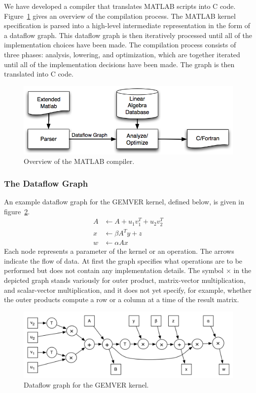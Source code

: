 \documentclass[11pt]{article}
\begin{document}
We have developed a compiler that translates MATLAB scripts into C code.    Figure~\ref{fig:compiler} gives an overview of the compilation process. The MATLAB kernel specification is parsed into a high-level intermediate representation in the form of a dataflow graph.  This dataflow graph is then iteratively processed until all of the implementation choices have been made.  The compilation process consists of three phases: analysis, lowering, and optimization, which are together iterated until all of the implementation decisions have been made.  The graph is then translated into C code.

\begin{figure}[htbp]
\centering
\includegraphics[width=.7\textwidth]{figures/compile.png}

\caption{Overview of the MATLAB compiler.}
\label{fig:compiler}
\end{figure}

\subsubsection{The Dataflow Graph}

An example dataflow graph for the GEMVER kernel, defined below, is given in figure~\ref{fig:gemver-dataflow}.
\begin{align*}
  A &\gets A + u_1 v_1^T + u_2 v_2^T \\[-0.5ex]
  x &\gets \beta A^T y + z \\[-0.5ex]
  w &\gets \alpha A x
\end{align*}
Each node represents a parameter of the kernel or an operation.  The arrows indicate the flow of data. At first the graph specifies what operations are to be performed but does not contain any implementation details. The symbol $\times$ in the depicted graph stands variously for outer product, matrix-vector multiplication, and scalar-vector multiplication, and it does not yet specify, for example, whether the outer products compute a row or a column at a time of the result matrix.

\begin{figure}[htbp]
\centering
\includegraphics[width=.7\textwidth]{figures/gemver-dataflow.png}
 
\caption{Dataflow graph for the GEMVER kernel.}
\label{fig:gemver-dataflow}
\end{figure}
\end{document}
